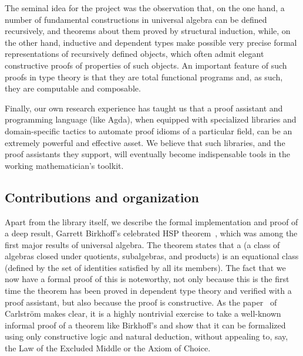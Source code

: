 \documentclass[a4paper,UKenglish,cleveref,autoref,thm-restate]{lipics-v2021}
\begin{document}
The seminal idea for the \agdaualib project was the observation that, on the one hand, a number of fundamental constructions in universal algebra can be defined recursively, and theorems about them proved by structural induction, while, on the other hand, inductive and dependent types make possible very precise formal representations of recursively defined objects, which often admit elegant constructive proofs of properties of such objects.  An important feature of such proofs in type theory is that they are total functional programs and, as such, they are computable and composable.

Finally, our own research experience has taught us that a proof assistant and programming language (like Agda), when equipped with specialized libraries and domain-specific tactics to automate proof idioms of a particular field, can be an extremely powerful and effective asset. We believe that such libraries, and the proof assistants they support, will eventually become indispensable tools in the working mathematician's toolkit.



\subsection{Contributions and organization}
\label{sec:contributions}

Apart from the library itself, we describe the formal implementation and proof of a deep result, Garrett Birkhoff's celebrated HSP theorem~\cite{Birkhoff:1935}, which was among the first major results of universal algebra.  The theorem states that a  (a class of algebras closed under quotients, subalgebras, and products) is an equational class (defined by the set of identities satisfied by all its members).  %
The fact that we now have a formal proof of this is noteworthy, not only because this is the first time the theorem has been proved in dependent type theory and verified with a proof assistant, but also because the proof is constructive. As the paper~\cite{Carlstrom:2008} of Carlstr\"om makes clear, it is a highly nontrivial exercise to take a well-known informal proof of a theorem like Birkhoff's and show that it can be formalized using only constructive logic and natural deduction, without appealing to, say, the Law of the Excluded Middle or the Axiom of Choice.
\end{document}
